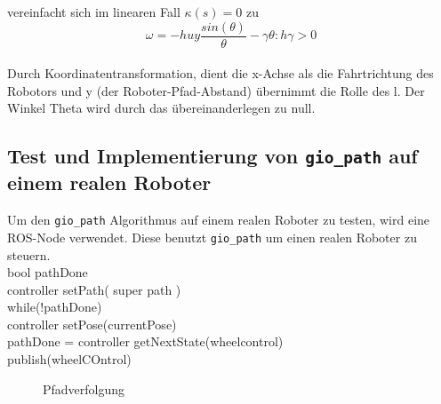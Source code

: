 \documentclass[11pt,a4paper]{article}
\begin{document}
{vereinfacht sich im linearen Fall $\kappa(s)=0$ zu \\

\begin{equation}
\omega= -h u y  \frac{sin(\theta)}{\theta}-\gamma\theta :h\gamma > 0
\end{equation}\\



Durch Koordinatentransformation, dient die x-Achse als die Fahrtrichtung des Robotors  und y (der Roboter-Pfad-Abstand) \"ubernimmt die Rolle des l. Der Winkel Theta wird durch das \"ubereinanderlegen zu null.




\subsection{Test und Implementierung von \texttt{gio\_path} auf einem realen Roboter}

Um den \texttt{gio\_path} Algorithmus auf einem realen Roboter zu testen, wird eine ROS-Node verwendet. Diese benutzt  \texttt{gio\_path} um einen realen Roboter zu steuern.
\\

  bool pathDone\\
  controller setPath( super path ) \\
  while(!pathDone)                  \\
	  controller setPose(currentPose)\\
	  pathDone = controller getNextState(wheelcontrol) \\
	  publish(wheelCOntrol)
\\

\begin{figure}[h]
	\centering
	\caption{Pfadverfolgung}
\end{figure}

}
\end{document}
